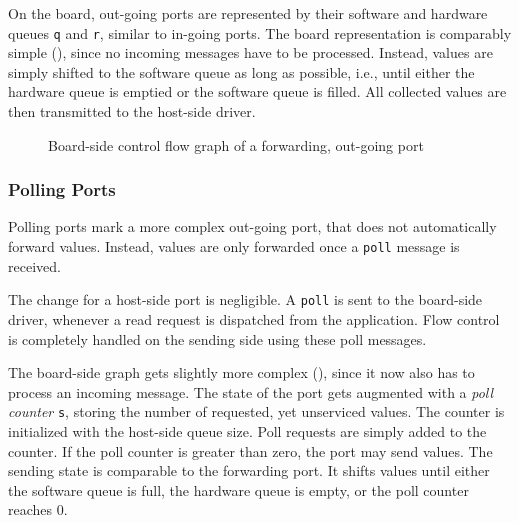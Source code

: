 \documentclass{report}
\begin{document}
On the board, out-going ports are represented by their software and hardware queues \texttt{q} and \texttt{r}, similar to in-going ports. The board representation is comparably simple (), since no incoming messages have to be processed. Instead, values are simply shifted to the software queue as long as possible, i.e., until either the hardware queue is emptied or the software queue is filled. All collected values are then transmitted to the host-side driver.

\begin{figure}[h]
\centering
{}
\label{fig:cfg:boardOut:fwd}
\caption{Board-side control flow graph of a forwarding, out-going port}
\end{figure}

\subsubsection{Polling Ports}
Polling ports mark a more complex out-going port, that does not automatically forward values. Instead, values are only forwarded once a \texttt{poll} message is received.

The change for a host-side port is negligible. A \texttt{poll} is sent to the board-side driver, whenever a read request is dispatched from the application. Flow control is completely handled on the sending side using these poll messages.

The board-side graph gets slightly more complex (), since it now also has to process an incoming message. The state of the port gets augmented with a \textit{poll counter} \texttt{s}, storing the number of requested, yet unserviced values. The counter is initialized with the host-side queue size. Poll requests are simply added to the counter. If the poll counter is greater than zero, the port may send values. The sending state is comparable to the forwarding port. It shifts values until either the software queue is full, the hardware queue is empty, or the poll counter reaches 0.
\end{document}
